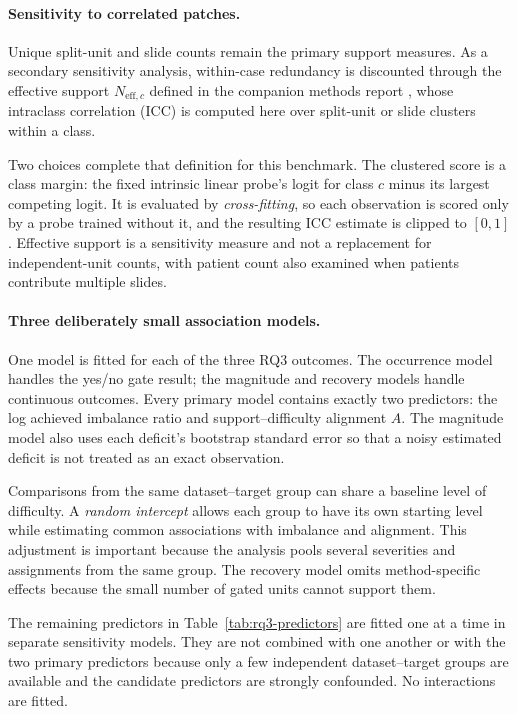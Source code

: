 \documentclass[11pt]{article}
\begin{document}
\paragraph{Sensitivity to correlated patches.}
Unique split-unit and slide counts remain the primary support measures. As a secondary sensitivity analysis, within-case redundancy is discounted through the effective support $N_{\mathrm{eff},c}$ defined in the companion methods report \citep{queisler2026imbalanceMethods}, whose intraclass correlation (ICC) is computed here over split-unit or slide clusters within a class.

Two choices complete that definition for this benchmark. The clustered score is a class margin: the fixed intrinsic linear probe's logit for class $c$ minus its largest competing logit. It is evaluated by \emph{cross-fitting}, so each observation is scored only by a probe trained without it, and the resulting ICC estimate is clipped to $[0,1]$. Effective support is a sensitivity measure and not a replacement for independent-unit counts, with patient count also examined when patients contribute multiple slides.

\paragraph{Three deliberately small association models.}
One model is fitted for each of the three RQ3 outcomes. The occurrence model handles the yes/no gate result; the magnitude and recovery models handle continuous outcomes. Every primary model contains exactly two predictors: the log achieved imbalance ratio and support--difficulty alignment $A$. The magnitude model also uses each deficit's bootstrap standard error so that a noisy estimated deficit is not treated as an exact observation.

Comparisons from the same dataset--target group can share a baseline level of difficulty. A \emph{random intercept} allows each group to have its own starting level while estimating common associations with imbalance and alignment. This adjustment is important because the analysis pools several severities and assignments from the same group. The recovery model omits method-specific effects because the small number of gated units cannot support them.

The remaining predictors in Table~\ref{tab:rq3-predictors} are fitted one at a time in separate sensitivity models. They are not combined with one another or with the two primary predictors because only a few independent dataset--target groups are available and the candidate predictors are strongly confounded. No interactions are fitted.
\end{document}
